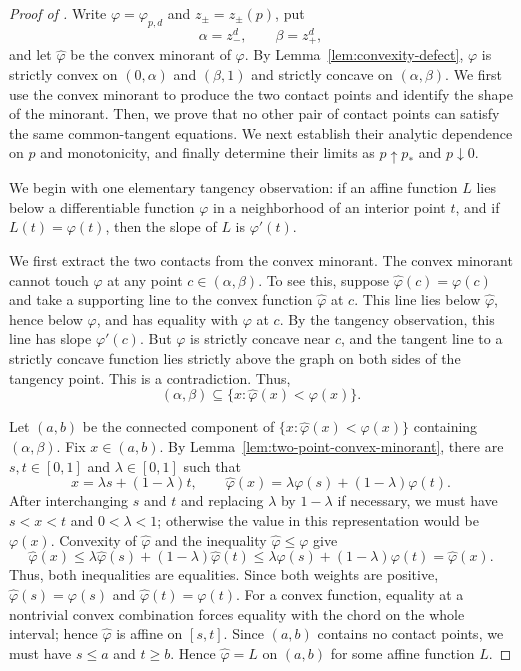 \begin{proof}[Proof of ]
Write $\varphi=\varphi_{p,d}$ and $z_\pm=z_\pm(p)$, put
\[
  \alpha=z_-^d,
  \qquad
  \beta=z_+^d,
\]
and let $\widehat\varphi$ be the convex minorant of $\varphi$.  By
Lemma~\ref{lem:convexity-defect}, $\varphi$ is strictly convex on
$(0,\alpha)$ and $(\beta,1)$ and strictly concave on $(\alpha,\beta)$.
We first use the convex minorant to produce the
two contact points and identify the shape of the minorant.  Then, we prove that
no other pair of contact points can satisfy the same common-tangent equations.
We next establish their analytic dependence on $p$ and monotonicity,
and finally determine their limits as $p\uparrow p_*$ and $p\downarrow0$.

We begin with one elementary tangency observation: if an affine
function $L$ lies below a differentiable function $\varphi$ in a neighborhood
of an interior point $t$, and if $L(t)=\varphi(t)$, then the slope of $L$ is
$\varphi'(t)$.

We first extract the two contacts from the convex minorant.  The convex
minorant cannot touch $\varphi$ at any point $c\in(\alpha,\beta)$.  To see
this, suppose $\widehat\varphi(c)=\varphi(c)$ and take a supporting line to the
convex function $\widehat\varphi$ at $c$.  This line lies below
$\widehat\varphi$, hence below
$\varphi$, and has equality with $\varphi$ at $c$.  By the tangency
observation, this line has slope $\varphi'(c)$.  But $\varphi$ is strictly
concave near $c$, and the tangent line to a strictly concave function lies
strictly above the graph on both sides of the tangency point.  This is a
contradiction.  Thus,
\[
  (\alpha,\beta)\subseteq\{x : \widehat\varphi(x)<\varphi(x)\}.
\]

Let $(a,b)$ be the connected component of
$\{x : \widehat\varphi(x)<\varphi(x)\}$ containing $(\alpha,\beta)$.  Fix
$x\in(a,b)$.  By Lemma~\ref{lem:two-point-convex-minorant}, there are
$s,t\in[0,1]$ and $\lambda\in[0,1]$ such that
\[
  x=\lambda s+(1-\lambda)t,
  \qquad
  \widehat\varphi(x)=\lambda\varphi(s)+(1-\lambda)\varphi(t).
\]
After interchanging $s$ and $t$ and replacing $\lambda$ by $1-\lambda$ if
necessary, we must have
$s<x<t$ and $0<\lambda<1$; otherwise the value in this representation would
be $\varphi(x)$.  Convexity of $\widehat\varphi$ and the inequality
$\widehat\varphi\le\varphi$ give
\[
  \widehat\varphi(x)
  \le \lambda\widehat\varphi(s)+(1-\lambda)\widehat\varphi(t)
  \le \lambda\varphi(s)+(1-\lambda)\varphi(t)
  =\widehat\varphi(x).
\]
Thus, both inequalities are equalities.  Since both weights are positive,
$\widehat\varphi(s)=\varphi(s)$ and
$\widehat\varphi(t)=\varphi(t)$.  For a convex function, equality at a
nontrivial convex combination forces equality with the chord on the whole
interval; hence $\widehat\varphi$ is affine on $[s,t]$.
Since $(a,b)$ contains no contact points, we must have $s\le a$ and $t\ge b$.
Hence
$\widehat\varphi=L$ on $(a,b)$ for some affine function $L$.


\end{proof}
